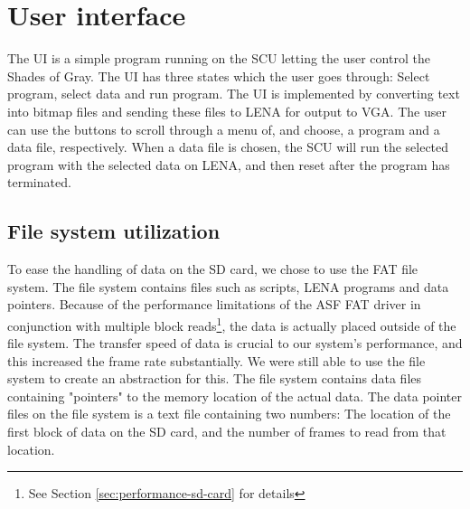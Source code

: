 \section{User interface}
The \ac{UI} is a simple program running on the \ac{SCU} letting the user control the { Shades of Gray}. The \ac{UI} has three states which the user goes through: Select program, select data and run program. The \ac{UI} is implemented by converting text into bitmap files and sending these files to \ac{LENA} for output to VGA. The user can use the buttons to scroll through a menu of, and choose, a program and a data file, respectively. When a data file is chosen, the \ac{SCU} will run the selected program with the selected data on \ac{LENA}, and then reset after the program has terminated.

\subsection{File system utilization}
To ease the handling of data on the SD card, we chose to use the FAT
file system. The file system contains files such as scripts, \ac{LENA}
programs and data pointers. Because of the performance limitations of
the \ac{ASF} FAT driver in conjunction with multiple block
reads\footnote{See Section \ref{sec:performance-sd-card} for details}, the
data is actually placed outside of the file system. The transfer speed
of data is crucial to our system's performance, and this increased the
frame rate substantially. We were still able to use the file system to
create an abstraction for this. The file system contains data files
containing "pointers" to the memory location of the actual data. The
data pointer files on the file system is a text file containing two
numbers: The location of the first block of data on the SD card, and the
number of frames to read from that location.


